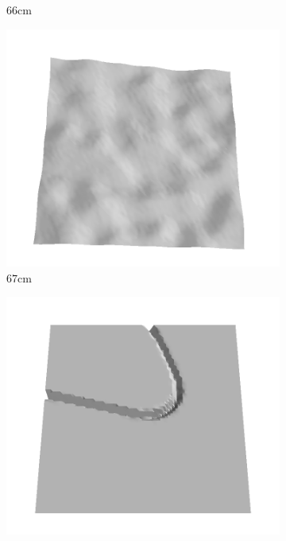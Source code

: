 \documentclass[../document.tex]{subfiles}
\begin{document}
\begin{figure}[htbp]
\begin{subfigure}[b]{0.19\textwidth}
    \caption{$66$cm}
    \end{subfigure}
    \begin{subfigure}[b]{0.19\textwidth}
    \includegraphics[width=\linewidth]{../img/5/train/all/67-patch-3d-majavi-36.png}
    \caption{$67$cm}
    \end{subfigure}
    \begin{subfigure}[b]{0.19\textwidth}
    \includegraphics[width=\linewidth]{../img/5/train/all/69-patch-3d-majavi-37.png}

\end{subfigure}
\end{figure}
\end{document}
